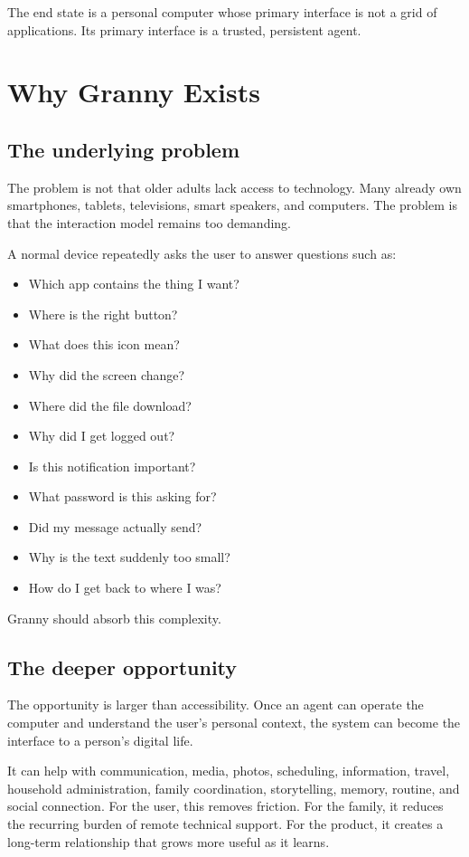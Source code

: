 \documentclass[11pt]{article}
\begin{document}
The end state is a personal computer whose primary interface is not a grid of applications. Its primary interface is a trusted, persistent agent.

\section{Why Granny Exists}

\subsection{The underlying problem}
The problem is not that older adults lack access to technology. Many already own smartphones, tablets, televisions, smart speakers, and computers. The problem is that the interaction model remains too demanding.

A normal device repeatedly asks the user to answer questions such as:

\begin{itemize}[leftmargin=*]
    \item Which app contains the thing I want?
    \item Where is the right button?
    \item What does this icon mean?
    \item Why did the screen change?
    \item Where did the file download?
    \item Why did I get logged out?
    \item Is this notification important?
    \item What password is this asking for?
    \item Did my message actually send?
    \item Why is the text suddenly too small?
    \item How do I get back to where I was?
\end{itemize}

Granny should absorb this complexity.

\subsection{The deeper opportunity}
The opportunity is larger than accessibility. Once an agent can operate the computer and understand the user's personal context, the system can become the interface to a person's digital life.

It can help with communication, media, photos, scheduling, information, travel, household administration, family coordination, storytelling, memory, routine, and social connection. For the user, this removes friction. For the family, it reduces the recurring burden of remote technical support. For the product, it creates a long-term relationship that grows more useful as it learns.
\end{document}
